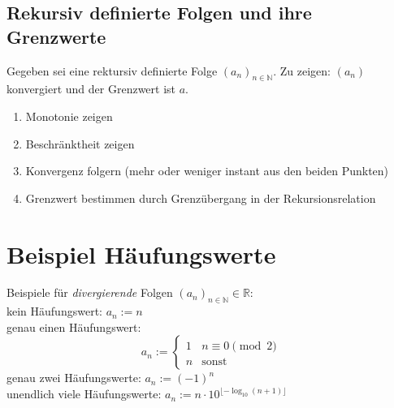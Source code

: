 \documentclass[10pt,a4paper^, twocolumn]{article}
\newcommand{\R}{\mathbb{R}}
\newcommand{\N}{\mathbb{N}}
\begin{document}
\subsection{Rekursiv definierte Folgen und ihre Grenzwerte}
	Gegeben sei eine rektursiv definierte Folge $(a_n)_{n \in \N}$. 
	Zu zeigen: $(a_n)$ konvergiert und der Grenzwert ist $a$.
	\begin{enumerate}
		\item Monotonie zeigen
		\item Beschränktheit zeigen
		\item Konvergenz folgern (mehr oder weniger instant aus den beiden Punkten)
		\item Grenzwert bestimmen durch Grenzübergang in der Rekursionsrelation
	\end{enumerate}

\section{Beispiel Häufungswerte}

Beispiele für \emph{divergierende} Folgen $(a_n)_{n \in \N} \in \R$:\\
kein Häufungswert: $a_n:= n$\\
genau einen Häufungswert:
$$a_n := \begin{cases} 1 & n \equiv 0 \pmod{2} \\ n & \text{sonst} \end{cases} $$
genau zwei Häufungswerte: $a_n := (-1)^n$\\
unendlich viele Häufungswerte: $a_n := n \cdot 10^{\lfloor- \log_{10}(n+1) \rfloor}$


%
%
%
%
%
%
%
%
\end{document}
